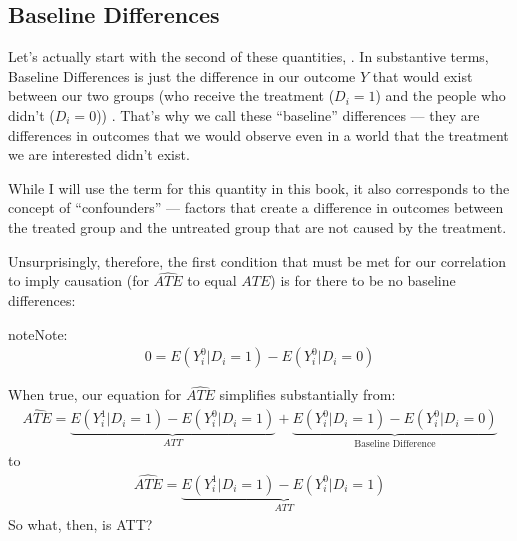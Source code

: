 \documentclass[letterpaper,10pt,english]{jupyterBook}
\begin{document}
\subsection{Baseline Differences}
\label{\detokenize{35_causal/10_potential_outcomes:baseline-differences}}
\sphinxAtStartPar
Let’s actually start with the second of these quantities, .  In substantive terms, Baseline Differences is just the difference in our outcome \(Y\) that would exist between our two groups (who  receive the treatment (\(D_i = 1\)) and the people who didn’t (\(D_i = 0\))) . That’s why we call these “baseline” differences — they are differences in outcomes that we would observe even in a world that the treatment we are interested didn’t exist.

\sphinxAtStartPar
While I will use the term  for this quantity in this book, it also corresponds to the concept of “confounders” — factors that create a difference in outcomes between the treated group and the untreated group that are not caused by the treatment.

\sphinxAtStartPar
Unsurprisingly, therefore, the first condition that must be met for our correlation to imply causation (for \(\widehat{ATE}\) to equal \(ATE\)) is for there to be no baseline differences:

\begin{sphinxadmonition}{note}{Note:}
\sphinxAtStartPar
{}
\begin{equation}\label{equation:35_causal/10_potential_outcomes:eqn:condition_1}
\begin{split}
0 = E(Y^0_i|D_i = 1) - E(Y_i^0|D_i = 0)
\end{split}
\end{equation}\end{sphinxadmonition}

\sphinxAtStartPar
When true, our equation for \(\widehat{ATE}\) simplifies substantially from:
\begin{equation*}
\begin{split}
\widehat{ATE} = \underbrace{E(Y^1_i|D_i = 1) - E(Y_i^0|D_i = 1)}_\text{$ATT$} + \underbrace{E(Y^0_i|D_i = 1) - E(Y_i^0|D_i = 0)}_\text{Baseline Difference}
\end{split}
\end{equation*}
\sphinxAtStartPar
to
\begin{equation*}
\begin{split}
\widehat{ATE} = \underbrace{E(Y^1_i|D_i = 1) - E(Y_i^0|D_i = 1)}_\text{$ATT$}
\end{split}
\end{equation*}
\sphinxAtStartPar
So what, then, is ATT?
\end{document}
